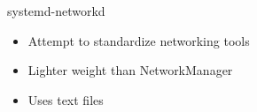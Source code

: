 \cprotect\note{

}


\begin{frame}
   {systemd-networkd}
      \begin{itemize}
         \item Attempt to standardize networking tools
	 \item Lighter weight than NetworkManager
	 \item Uses text files
      \end{itemize}

\end{frame}

\cprotect\note{

}

